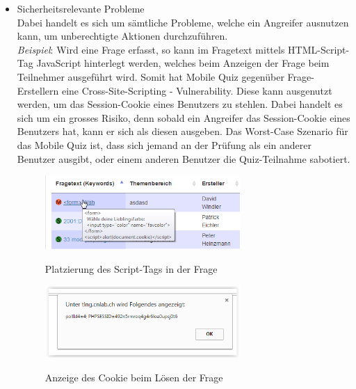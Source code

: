 	
	\begin{itemize}
		\item Sicherheitsrelevante Probleme \\
		Dabei handelt es sich um sämtliche Probleme, welche ein Angreifer ausnutzen kann, um unberechtigte Aktionen durchzuführen. \\
		\textit{Beispiel}: Wird eine Frage erfasst, so kann im Fragetext mittels HTML-Script-Tag JavaScript hinterlegt werden, welches beim Anzeigen der Frage beim Teilnehmer ausgeführt wird. Somit hat Mobile Quiz gegenüber Frage-Erstellern eine \gls{Cross-Site-Scripting} - \gls{Vulnerability}. Diese kann ausgenutzt werden, um das \gls{Session-Cookie} eines Benutzers zu stehlen. Dabei handelt es sich um ein grosses Risiko, denn sobald ein Angreifer das Session-Cookie eines Benutzers hat, kann er sich als diesen ausgeben. Das Worst-Case Szenario für das Mobile Quiz ist, dass sich jemand an der Prüfung als ein anderer Benutzer ausgibt, oder einem anderen Benutzer die Quiz-Teilnahme sabotiert.
		
		
		\begin{figure}[H]
			\centering
			\includegraphics[width=0.7\textwidth
			]{Images/XSS_Frage.PNG}
			\caption{Platzierung des Script-Tags in der Frage}
			\cite{mobilequiz.ch}
		\end{figure}
		
		\begin{figure}[H]
			\centering
			\includegraphics[width=0.7\textwidth
			]{Images/XSS_Cookie.PNG}
			\caption{Anzeige des Cookie beim Lösen der Frage}
			\cite{mobilequiz.ch}
		\end{figure}
		

\end{itemize}

